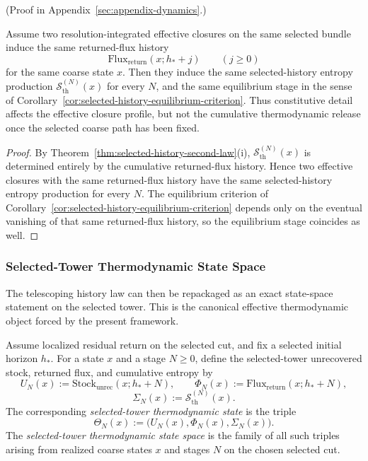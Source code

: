 (Proof in Appendix~\ref{sec:appendix-dynamics}.)

\begin{corollary}
\label{cor:characteristic-cancellation-of-constitutive-detail}
Assume two resolution-integrated effective closures on the same selected bundle
induce the same returned-flux history
\[
\mathrm{Flux}_{\mathrm{return}}(x;h_\ast+j)
\qquad (j\ge 0)
\]
for the same coarse state \(x\). Then they induce the same selected-history
entropy production \(\mathcal S_{\mathrm{th}}^{(N)}(x)\) for every \(N\), and
the same equilibrium stage in the sense of
Corollary~\ref{cor:selected-history-equilibrium-criterion}. Thus constitutive
detail affects the effective closure profile, but not the cumulative
thermodynamic release once the selected coarse path has been fixed.
\end{corollary}

\begin{proof}
By Theorem~\ref{thm:selected-history-second-law}(i),
\(\mathcal S_{\mathrm{th}}^{(N)}(x)\) is determined entirely by the cumulative
returned-flux history. Hence two effective closures with the same returned-flux
history have the same selected-history entropy production for every \(N\). The
equilibrium criterion of
Corollary~\ref{cor:selected-history-equilibrium-criterion} depends only on the
eventual vanishing of that same returned-flux history, so the equilibrium stage
coincides as well.
\end{proof}

\subsubsection{Selected-Tower Thermodynamic State Space}

The telescoping history law can then be repackaged as an exact state-space
statement on the selected tower. This is the canonical effective
thermodynamic object forced by the present framework.

\begin{definition}
\label{def:selected-tower-thermodynamic-state}
Assume localized residual return on the selected cut, and fix a selected
initial horizon \(h_\ast\). For a state \(x\) and a stage \(N\ge 0\), define
the selected-tower unrecovered stock, returned flux, and cumulative entropy by
\[
U_N(x)
:=
\mathrm{Stock}_{\mathrm{unrec}}(x;h_\ast+N),
\qquad
\Phi_N(x)
:=
\mathrm{Flux}_{\mathrm{return}}(x;h_\ast+N),
\]
\[
\Sigma_N(x)
:=
\mathcal S_{\mathrm{th}}^{(N)}(x).
\]
The corresponding \emph{selected-tower thermodynamic state} is the triple
\[
\Theta_N(x)
:=
\bigl(U_N(x),\Phi_N(x),\Sigma_N(x)\bigr).
\]
The \emph{selected-tower thermodynamic state space} is the family of all such
triples arising from realized coarse states \(x\) and stages \(N\) on the
chosen selected cut.
\end{definition}

